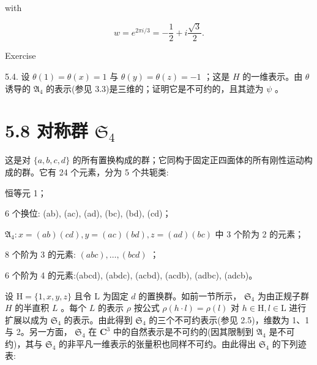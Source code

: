 \documentclass[10pt]{article}
\begin{document}
with

\[
w = {e}^{{2\pi i}/3} =  - \frac{1}{2} + i\frac{\sqrt{3}}{2}.
\]

Exercise

5.4. 设 \(\theta \left( 1\right)  = \theta \left( x\right)  = 1\) 与 \(\theta \left( y\right)  = \theta \left( z\right)  =  - 1\) ；这是 \(H\) 的一维表示。由 \(\theta\) 诱导的 \({\mathfrak{A}}_{4}\) 的表示(参见 3.3)是三维的；证明它是不可约的，且其迹为 \(\psi\) 。

\section*{5.8 对称群 \({\mathfrak{S}}_{4}\)}

这是对 \(\{ a,b,c,d\}\) 的所有置换构成的群；它同构于固定正四面体的所有刚性运动构成的群。它有 24 个元素，分为 5 个共轭类:

恒等元 1；

6 个换位: (ab), (ac), (ad), (bc), (bd), (cd)；

\({\mathfrak{A}}_{4} : x = \left( {ab}\right) \left( {cd}\right) ,y = \left( {ac}\right) \left( {bd}\right) ,z = \left( {ad}\right) \left( {bc}\right)\) 中 3 个阶为 2 的元素；

8 个阶为 3 的元素: \(\left( {abc}\right) ,\ldots ,\left( {bcd}\right)\) ；

6 个阶为 4 的元素:(abcd), (abdc), (acbd), (acdb), (adbc), (adcb)。

设 \(\mathrm{H} = \{ 1,x,y,z\}\) 且令 \(\mathrm{L}\) 为固定 \(d\) 的置换群。如前一节所示， \({\mathfrak{S}}_{4}\) 为由正规子群 \(H\) 的半直积 \(L\) 。每个 \(L\) 的表示 \(\rho\) 按公式 \(\rho \left( {h \cdot  l}\right)  = \rho \left( l\right)\) 对 \(h \in  \mathrm{H},l \in  \mathrm{L}\) 进行扩展以成为 \({\mathfrak{S}}_{4}\) 的表示。由此得到 \({\mathfrak{S}}_{4}\) 的三个不可约表示(参见 2.5)，维数为 1、1 与 2。另一方面， \({\mathfrak{S}}_{4}\) 在 \({\mathbf{C}}^{3}\) 中的自然表示是不可约的(因其限制到 \({\mathfrak{A}}_{4}\) 是不可约)，其与 \({\mathfrak{S}}_{4}\) 的非平凡一维表示的张量积也同样不可约。由此得出 \({\mathfrak{S}}_{4}\) 的下列迹表:

\begin{center}
\end{center}
\end{document}
